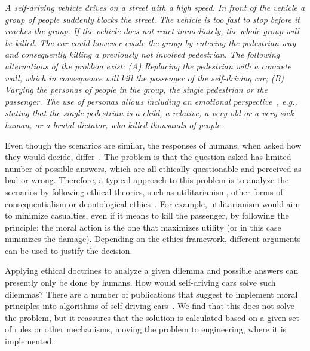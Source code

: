 \textit{
A self-driving vehicle drives on a street with a high speed. In front of the vehicle a group of people suddenly blocks the street. The vehicle is too fast to stop before it reaches the group. If the vehicle does not react immediately, the whole group will be killed. The car could however evade the group by entering the pedestrian way and consequently killing a previously not involved pedestrian. The following alternations of the problem exist: (A) Replacing the pedestrian with a concrete wall, which in consequence will kill the passenger of the self-driving car; (B) Varying the personas of people in the group, the single pedestrian or the passenger. The use of personas allows including an emotional perspective~\cite{BleskeRechek2010}, e.g., stating that the single pedestrian is a child, a relative, a very old or a very sick human, or a brutal dictator, who killed thousands of people.}

Even though the scenarios are similar, the responses of humans, when asked how they would decide, differ~\cite{Bonnefon2016}. The problem is that the question asked has limited number of possible answers, which are all ethically questionable and perceived as bad or wrong. Therefore, a typical approach to this problem is to analyze the scenarios by following ethical theories, such as utilitarianism, other forms of consequentialism or deontological ethics~\cite{mackinnon2012ethics}. For example, utilitarianism would aim to minimize casualties, even if it means to kill the passenger, by following the principle: the moral action is the one that maximizes utility (or in this case minimizes the damage). Depending on the ethics framework, different arguments can be used to justify the decision. 

Applying ethical doctrines to analyze a given dilemma and possible answers can presently only be done by humans. How would self-driving cars solve such dilemmas? There are a number of publications that suggest to implement moral principles into algorithms of self-driving cars~\cite{Goodall2016,DENNIS20161,Dennis2014}. We find that this does not solve the problem, but it reassures that the solution is calculated based on a given set of rules or other mechanisms, moving the problem to engineering, where it is implemented.


